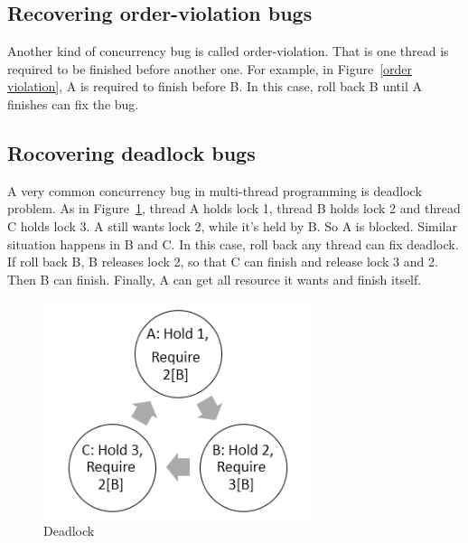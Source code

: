 \subsection{Recovering order-violation bugs}
Another kind of concurrency bug is called order-violation. That is one thread is required to be finished before another one. For example, in Figure~\ref{order violation}, A is required to finish before B. In this case, roll back B until A finishes can fix the bug.
\subsection{Rocovering deadlock bugs}
A very common concurrency bug in multi-thread programming is deadlock problem. As in Figure~\ref{deadlock}, thread A holds lock 1, thread B holds lock 2 and thread C holds lock 3. A still wants lock 2, while it's held by B. So A is blocked. Similar situation happens in B and C. In this case, roll back any thread can fix deadlock. If roll back B, B releases lock 2, so that C can finish and release lock 3 and 2. Then B can finish. Finally, A can get all resource it wants and finish itself.
\begin{figure}[t]
\centering
\includegraphics[width=0.7\textwidth]{body/deadlock.png}
\caption{Deadlock}
\label{deadlock}
\end{figure}

